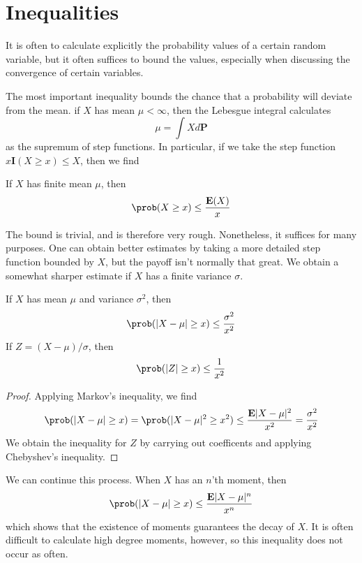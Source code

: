 \chapter{Inequalities}

It is often to calculate explicitly the probability values of a certain random variable, but it often suffices to bound the values, especially when discussing the convergence of certain variables.

The most important inequality bounds the chance that a probability will deviate from the mean. if $X$ has mean $\mu < \infty$, then the Lebesgue integral calculates
%
\[ \mu = \int X d\mathbf{P} \]
%
as the supremum of step functions. In particular, if we take the step function $x \mathbf{I}(X \geq x) \leq X$, then we find

\begin{theorem}
    If $X$ has finite mean $\mu$, then
    \[ \prob(X \geq x) \leq \frac{\mathbf{E}(X)}{x} \]
\end{theorem}

The bound is trivial, and is therefore very rough. Nonetheless, it suffices for many purposes. One can obtain better estimates by taking a more detailed step function bounded by $X$, but the payoff isn't normally that great. We obtain a somewhat sharper estimate if $X$ has a finite variance $\sigma$.

\begin{theorem}
    If $X$ has mean $\mu$ and variance $\sigma^2$, then
    \[ \prob(|X - \mu| \geq x) \leq \frac{\sigma^2}{x^2} \]
    If $Z = (X - \mu)/\sigma$, then
    \[ \prob(|Z| \geq x) \leq \frac{1}{x^2} \]
\end{theorem}
\begin{proof}
    Applying Markov's inequality, we find
    \[ \prob(|X - \mu| \geq x) = \prob(|X - \mu|^2 \geq x^2) \leq \frac{\mathbf{E}|X - \mu|^2}{x^2} = \frac{\sigma^2}{x^2} \]
    We obtain the inequality for $Z$ by carrying out coefficents and applying Chebyshev's inequality.
\end{proof}

We can continue this process. When $X$ has an $n$'th moment, then
%
\[ \prob(|X - \mu| \geq x) \leq \frac{\mathbf{E}|X - \mu|^n}{x^n} \]
%
which shows that the existence of moments guarantees the decay of $X$. It is often difficult to calculate high degree moments, however, so this inequality does not occur as often.

